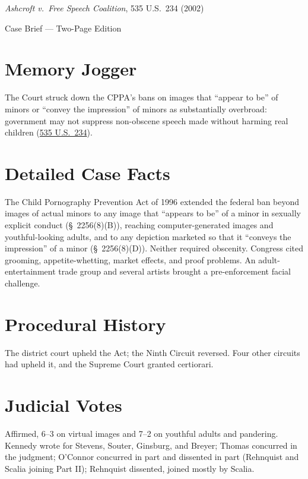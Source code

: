 \documentclass[12pt]{article}
\begin{document}
\begin{center}
{\LARGE \textit{Ashcroft v.\ Free Speech Coalition}, 535 U.S.\ 234 (2002)\par}
\vspace{0.5em}
{\large Case Brief --- Two-Page Edition\par}
\end{center}

\section{Memory Jogger}
The Court struck down the CPPA's bans on images that ``appear to be'' of minors or ``convey the impression'' of minors as substantially overbroad: government may not suppress non-obscene speech made without harming real children (\href{https://supreme.justia.com/cases/federal/us/535/234/}{535 U.S.\ 234}).

\section{Detailed Case Facts}
The Child Pornography Prevention Act of 1996 extended the federal ban beyond images of actual minors to any image that ``appears to be'' of a minor in sexually explicit conduct (\S~2256(8)(B)), reaching computer-generated images and youthful-looking adults, and to any depiction marketed so that it ``conveys the impression'' of a minor (\S~2256(8)(D)). Neither required obscenity. Congress cited grooming, appetite-whetting, market effects, and proof problems. An adult-entertainment trade group and several artists brought a pre-enforcement facial challenge.

\section{Procedural History}
The district court upheld the Act; the Ninth Circuit reversed. Four other circuits had upheld it, and the Supreme Court granted certiorari.

\section{Judicial Votes}
Affirmed, 6--3 on virtual images and 7--2 on youthful adults and pandering. Kennedy wrote for Stevens, Souter, Ginsburg, and Breyer; Thomas concurred in the judgment; O'Connor concurred in part and dissented in part (Rehnquist and Scalia joining Part II); Rehnquist dissented, joined mostly by Scalia.
\end{document}
